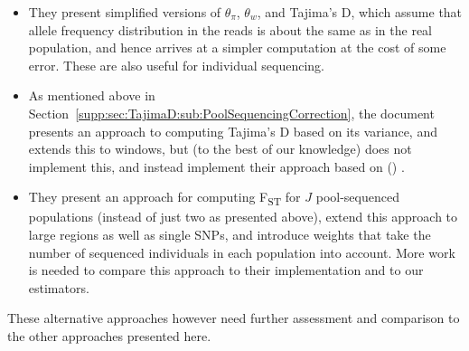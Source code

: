 \documentclass[letterpaper,fontsize=9pt,DIV=12]{scrartcl}
\newcounter{popoolissue}
\newcommand\popoolissue[1]{}
\newcommand\citeay[1]{\citeauthor{#1} (\citeyear{#1}) \cite{#1}}
\newcommand\toolname{\textsc}
\newcommand\secref[1]{Section~\ref{#1}}
\newcommand{\fst}{F\textsubscript{ST}}
\begin{document}
\begin{itemize}
  \item They present simplified versions of $\theta_\pi$, $\theta_w$, and Tajima's D, which assume that allele frequency distribution in the reads is about the same as in the real population, and hence arrives at a simpler computation at the cost of some error. These are also useful for individual sequencing.
  \item As mentioned above in \secref{supp:sec:TajimaD:sub:PoolSequencingCorrection}, the document presents an approach to computing Tajima's D based on its variance, and extends this to windows, but (to the best of our knowledge) does not implement this, and instead implement their approach based on \citeay{Achaz2008}.
  \item They present an approach for computing \fst{} for $J$ pool-sequenced populations (instead of just two as presented above), extend this approach to large regions as well as single SNPs, and introduce weights that take the number of sequenced individuals in each population into account. More work is needed to compare this approach to their implementation and to our estimators.
\end{itemize}

These alternative approaches however need further assessment and comparison to the other approaches presented here.

\popoolissue{Lastly, we wanted to note that to us it seems that some equations in the PoPoolation equations document are not actually implemented in the code, and that the code contains compuations that are not in the document. We hence think that those were never intended to go hand in hand, and that hence the equations document is also not part of the official publication, but merely found in the code repository. Is that assessment correct, or are there other reasons for the divergence between the two?}


\end{document}
